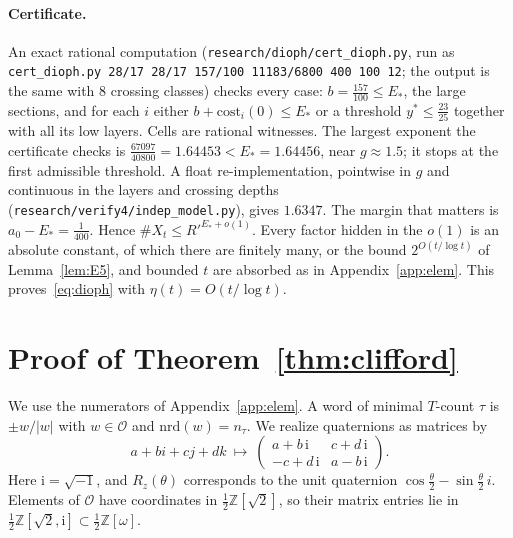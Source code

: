 \documentclass[aps,prx,twocolumn,superscriptaddress,nofootinbib,longbibliography]{revtex4-2}
\theoremstyle{plain}
\theoremstyle{definition}
\theoremstyle{remark}
\newcommand{\Z}{\mathbb{Z}}
\begin{document}
\paragraph{Certificate.} {\raggedright An exact rational computation (\texttt{research/dioph/cert\_dioph.py}, run as \texttt{cert\_dioph.py 28/17 28/17 157/100 11183/6800 400 100 12}; the output is the same with $8$ crossing classes) checks every case: $b=\tfrac{157}{100}\le E_*$, the large sections, and for each $i$ either $b+\mathrm{cost}_i(0)\le E_*$ or a threshold $y^*\le\tfrac{23}{25}$ together with all its low layers. Cells are rational witnesses. The largest exponent the certificate checks is $\tfrac{67097}{40800}=1.64453<E_*=1.64456$, near $g\approx1.5$; it stops at the first admissible threshold. A float re-implementation, pointwise in $g$ and continuous in the layers and crossing depths (\texttt{research/verify4/indep\_model.py}), gives $1.6347$. The margin that matters is $a_0-E_*=\tfrac1{400}$. Hence $\#X_t\le R'^{E_*+o(1)}$. Every factor hidden in the $o(1)$ is an absolute constant, of which there are finitely many, or the bound $2^{O(t/\log t)}$ of Lemma~\ref{lem:E5}, and bounded $t$ are absorbed as in Appendix~\ref{app:elem}. This proves~\eqref{eq:dioph} with $\eta(t)=O(t/\log t)$.\par}

\section{Proof of Theorem~\ref{thm:clifford}}\label{app:clifford}

We use the numerators of Appendix~\ref{app:elem}. A word of minimal $T$-count $\tau$ is $\pm w/|w|$ with $w\in\mathcal O$ and $\mathrm{nrd}(w)=n_\tau$. We realize quaternions as matrices by
\[
a+bi+cj+dk\ \mapsto\ \begin{pmatrix}a+b\,\mathrm i&c+d\,\mathrm i\\-c+d\,\mathrm i&a-b\,\mathrm i\end{pmatrix}.
\]
Here $\mathrm i=\sqrt{-1}$, and $R_z(\theta)$ corresponds to the unit quaternion $\cos\tfrac\theta2-\sin\tfrac\theta2\,i$. Elements of $\mathcal O$ have coordinates in $\tfrac12\Z[\sqrt2]$, so their matrix entries lie in $\tfrac12\Z[\sqrt2,\mathrm i]\subset\tfrac12\Z[\omega]$.
\end{document}
